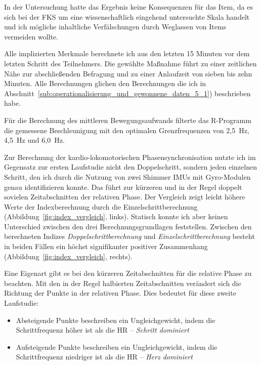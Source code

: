 In der Untersuchung hatte das Ergebnis keine Konsequenzen für das Item, da es sich bei der \ac{FKS} um eine wissenschaftlich eingehend untersuchte Skala handelt und ich mögliche inhaltliche Verfälschungen durch Weglassen von Items vermeiden wollte. 

Alle implizierten Merkmale berechnete ich aus den letzten 15 Minuten vor dem letzten Schritt des Teilnehmers. Die gewählte Maßnahme führt zu einer zeitlichen Nähe zur abschließenden Befragung und zu einer Anlaufzeit von sieben bis zehn Minuten. Alle Berechnungen glichen den Berechnungen die ich in Abschnitt~\ref{sub:operationalisierung_und_gewonnene_daten_5_1}) beschrieben habe.

Für die Berechnung des mittleren Bewegungsaufwands filterte das R-Programm die gemessene Beschleunigung mit den optimalen Grenzfrequenzen von 2,5~Hz, 4,5~Hz und 6,0~Hz. 

Zur Berechnung der kardio-lokomotorischen Phasensynchronisation nutzte ich im Gegensatz zur ersten Laufstudie nicht den Doppelschritt, sondern jeden einzelnen Schritt, den ich durch die Nutzung von zwei Shimmer \acp{IMU} mit Gyro-Modulen genau identifizieren konnte. Das führt zur kürzeren und in der Regel doppelt sovielen Zeitabschnitten der relativen Phase. Der Vergleich zeigt leicht höhere Werte der Indexberechnung durch die Einzelschrittberechnung (Abbildung~\ref{fig:index_vergleich}, links). Statisch konnte ich aber keinen Unterschied zwischen den drei Berechnungsgrundlagen feststellen. Zwischen den berechneten Indizes \emph{Doppelschrittberechnung} und \emph{Einzelschrittberechnung} besteht in beiden Fällen ein höchst signifikanter positiver Zusammenhang (Abbildung~\ref{fig:index_vergleich}, rechts). 

Eine Eigenart gibt es bei den kürzeren Zeitabschnitten für die relative Phase zu beachten. Mit den in der Regel halbierten Zeitabschnitten verändert sich die Richtung der Punkte in der relativen Phase. Dies bedeutet für diese zweite Laufstudie:
\begin{itemize}
	
	\item Absteigende Punkte beschreiben ein Ungleichgewicht, indem die Schrittfrequenz höher ist als die \ac{HR} -- \emph{Schritt dominiert}
	
	\item Aufsteigende Punkte beschreiben ein Ungleichgewicht, indem die Schrittfrequenz niedriger ist als die \ac{HR} -- \emph{Herz dominiert}
\end{itemize}

